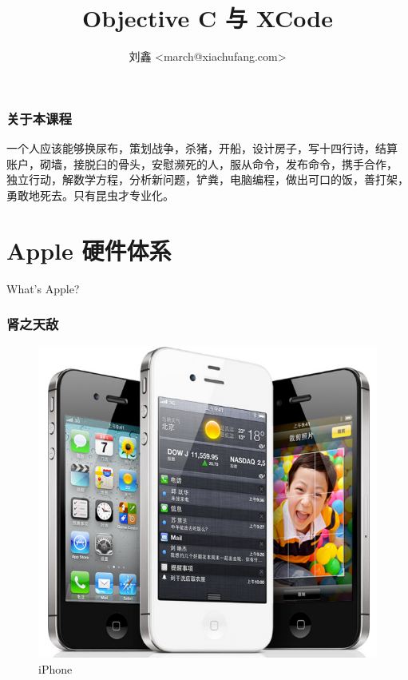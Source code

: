 \documentclass[utf8x, notes=hide]{beamer}
\title{Objective C 与 XCode}
\author[刘鑫]{刘鑫 <march@xiachufang.com>}
\institute{iOS 及 Mac OS 开发简介}
\begin{document}
\frame{\titlepage}

\begin{frame}
  \frametitle{关于本课程}
一个人应该能够换尿布，策划战争，杀猪，开船，设计房子，写十四行诗，结算
账户，砌墙，接脱臼的骨头，安慰濒死的人，服从命令，发布命令，携手合作，
独立行动，解数学方程，分析新问题，铲粪，电脑编程，做出可口的饭，善打架，
勇敢地死去。只有昆虫才专业化。\\
\end{frame}

\section{Apple 硬件体系}
\begin{frame}
  \begin{center}
\begin{Huge}
What's Apple?
\end{Huge}
  \end{center}
\end{frame}
\begin{frame}
\frametitle{肾之天敌}
  \begin{figure}
    \centering
    \includegraphics[bb=0 0 609 560,scale=.2]{images/iPhone.png}
    \caption{iPhone}
    \label{fig:iPhone}
  \end{figure}
\end{frame}
\end{document}
